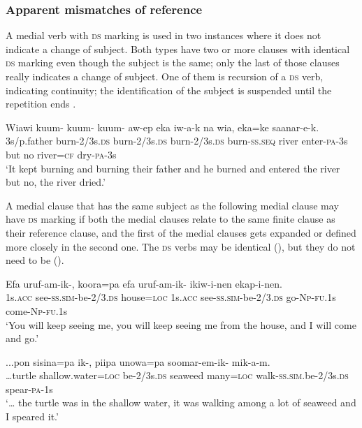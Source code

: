 \subsubsection[Apparent mismatches of reference]{Apparent mismatches of reference}

A medial verb with \textsc{ds} marking is used in two instances where it does not indicate a change of subject. Both types have two or more clauses with identical \textsc{ds} marking even though the subject is the same; only the last of those clauses really indicates a change of subject. One of them is recursion of a \textsc{ds} verb, indicating continuity; the identification of the subject is suspended until the repetition ends \citep[201]{Reesink1987}. 

\ea%
\label{ex:x1493}
\gll Wiawi  kuum-  kuum-  kuum-  aw-ep eka  iw-a-k  na  wia,  eka=ke  saanar-e-k. \\
3s/p.father burn-2/3s.\textsc{ds} burn-2/3s.\textsc{ds} burn-2/3s.\textsc{ds} burn-\textsc{ss}.\textsc{seq} river enter-\textsc{pa}-3s but no river=\textsc{cf} dry-\textsc{pa}-3s\\
\glt`It kept burning and burning their father and he burned and entered the river but no, the river dried.'
\z


A medial clause that has the same subject as the following medial clause may have \textsc{ds} marking if both the medial clauses relate to the same finite clause as their reference clause, and the first of the medial clauses gets expanded or defined more closely in the second one. The \textsc{ds} verbs may be identical (), but they do not need to be ().

\ea%
\label{ex:x1494}
\gll Efa  uruf-am-ik-,  koora=pa  efa  uruf-am-ik- ikiw-i-nen  ekap-i-nen.\\
1s.\textsc{acc}  see-\textsc{ss}.\textsc{sim}-be-2/3.\textsc{ds} house=\textsc{loc} 1s.\textsc{acc} see-\textsc{ss}.\textsc{sim}-be-2/3.\textsc{ds} go-\textsc{Np}-\textsc{fu}.1s come-\textsc{Np}-\textsc{fu}.1s    \\
\glt`You will keep seeing me, you will keep seeing me from the house, and I will come and go.'
\z


\ea%
\label{ex:x1495}
\gll ...pon  sisina=pa  ik-,  piipa  unowa=pa soomar-em-ik-  mik-a-m. \\
{\dots}turtle  shallow.water=\textsc{loc} be-2/3s.\textsc{ds} seaweed  many=\textsc{loc} walk-\textsc{ss}.\textsc{sim}.be-2/3s.\textsc{ds} spear-\textsc{pa}-1s\\
\glt`{\dots} the turtle was in the shallow water, it was walking among a lot of seaweed and I speared it.'
\z


